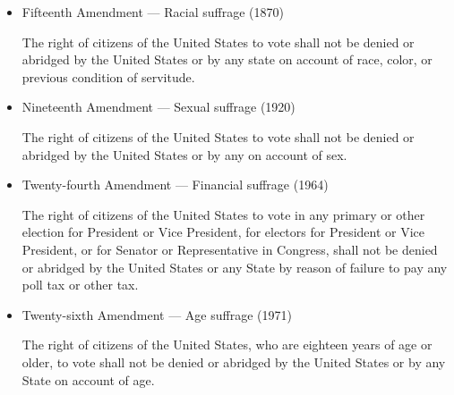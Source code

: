 \begin{itemize}
  \item Fifteenth Amendment --- Racial suffrage (1870)
    \begin{displayquote}
      The right of citizens of the United States to vote shall not be denied or
      abridged by the United States or by any state on account of race, color,
      or previous condition of servitude.
    \end{displayquote}

  \item Nineteenth Amendment --- Sexual suffrage (1920)
    \begin{displayquote}
      The right of citizens of the United States to vote shall not be denied or
      abridged by the United States or by any on account of sex.
    \end{displayquote}

  \item Twenty-fourth Amendment --- Financial suffrage (1964)
    \begin{displayquote}
      The right of citizens of the United States to vote in any primary or other
      election for President or Vice President, for electors for President or
      Vice President, or for Senator or Representative in Congress, shall not be
      denied or abridged by the United States or any State by reason of failure
      to pay any poll tax or other tax.
    \end{displayquote}

  \item Twenty-sixth Amendment --- Age suffrage (1971)
    \begin{displayquote}
      The right of citizens of the United States, who are eighteen years of age
      or older, to vote shall not be denied or abridged by the United States or
      by any State on account of age.
    \end{displayquote}
\end{itemize}

